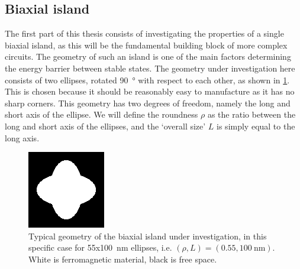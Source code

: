 \documentclass[10pt,a4paper]{article}
\begin{document}
\subsection{Biaxial island}
\label{par:Biaxial_island}
The first part of this thesis consists of investigating the properties of a single biaxial island, as this will be the fundamental building block of more complex circuits. The geometry of such an island is one of the main factors determining the energy barrier between stable states. The geometry under investigation here consists of two ellipses, rotated \SI{90}{\degree} with respect to each other, as shown in \cref{fig:biaxial_island:geometryTypical}. This is chosen because it should be reasonably easy to manufacture as it has no sharp corners. This geometry has two degrees of freedom, namely the long and short axis of the ellipse. We will define the roundness $\rho$ as the ratio between the long and short axis of the ellipses, and the `overall size' $L$ is simply equal to the long axis.
\begin{figure}
    \centering
    \includegraphics[width=0.3\columnwidth]{Figures/biaxial_island/Geometry/geomPlus55.png}
    \caption{Typical geometry of the biaxial island under investigation, in this specific case for 55x\SI{100}{\nano\metre} ellipses, i.e. $(\rho, L)=(0.55, \SI{100}{\nano\metre})$. White is ferromagnetic material, black is free space.}
    \label{fig:biaxial_island:geometryTypical}
\end{figure}
\end{document}
